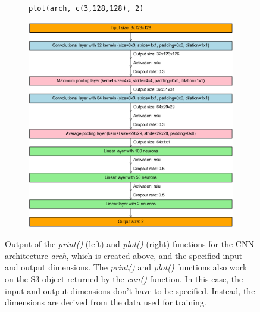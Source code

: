 \documentclass[12pt,twoside]{scrreport}
\newcommand{\fn}[2][]{\textit{#2(}#1\textit{)}}
\begin{document}
\begin{figure}[t]
\begin{subfigure}{0.47\textwidth}
		\centering
		\vspace*{0.2cm}
		\newsavebox{\plotbox} %
		\begin{lrbox}{\plotbox}
			\begin{lstlisting}[basicstyle=\footnotesize]
plot(arch, c(3,128,128), 2)
			\end{lstlisting}
		\end{lrbox}
		\fbox{\usebox{\plotbox}}
		\newline
		\vspace*{0.04cm}
		\includegraphics[width=\textwidth]{plot.pdf}
	\end{subfigure}
	\caption{Output of the \fn{print} (left) and \fn{plot} (right) functions for the CNN architecture \textit{arch}, which is created above, and the specified input and output dimensions. The \fn{print} and \fn{plot} functions also work on the S3 object returned by the \fn{cnn} function. In this case, the input and output dimensions don't have to be specified. Instead, the dimensions are derived from the data used for training.}
	\label{printplot}
\end{figure}
\end{document}
